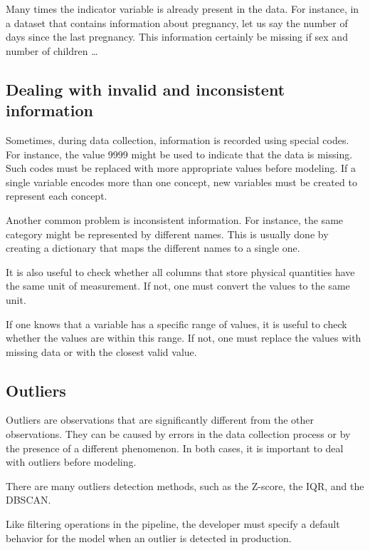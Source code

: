 Many times the indicator variable is already present in the data.  For instance, in a
dataset that contains information about pregnancy, let us say the number of days since
the last pregnancy.  This information certainly be missing if sex and number of children \dots


\subsection{Dealing with invalid and inconsistent information}

Sometimes, during data collection, information is recorded using special codes.  For
instance, the value 9999 might be used to indicate that the data is missing.  Such codes
must be replaced with more appropriate values before modeling.  If a single variable
encodes more than one concept, new variables must be created to represent each concept.

Another common problem is inconsistent information.  For instance, the same category might
be represented by different names.  This is usually done by creating a dictionary that
maps the different names to a single one.

It is also useful to check whether all columns that store physical quantities have the
same unit of measurement.  If not, one must convert the values to the same unit.

If one knows that a variable has a specific range of values, it is useful to check
whether the values are within this range.  If not, one must replace the values with
missing data or with the closest valid value.

\subsection{Outliers}

Outliers are observations that are significantly different from the other observations.
They can be caused by errors in the data collection process or by the presence of a
different phenomenon.  In both cases, it is important to deal with outliers before
modeling.

There are many outliers detection methods, such as the Z-score, the IQR, and the DBSCAN.

Like filtering operations in the pipeline, the developer must specify a default behavior
for the model when an outlier is detected in production.

